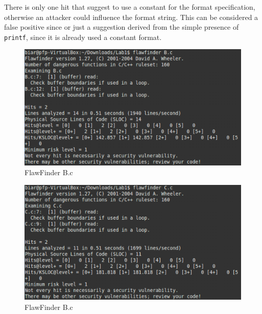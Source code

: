 \documentclass[a4paper]{article}
\begin{document}
There is only one hit that suggest to use a constant for the format specification, otherwise an 
attacker could influence the format string. This can be considered a false positive since or
just a suggestion derived from the simple presence of \texttt{printf}, since it is already used 
a constant format.
\bigskip

\begin{figure}[h!]
    \centering
    \includegraphics[width=0.6\linewidth]{B-f}
    \caption{FlawFinder B.c}
\end{figure}

\begin{figure}[h!]
    \centering
    \includegraphics[width=0.6\linewidth]{C-f}
    \caption{FlawFinder B.c}
\end{figure}
\end{document}
